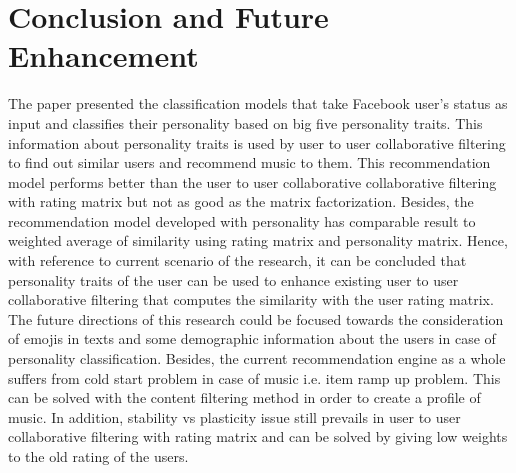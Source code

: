 \documentclass[journal]{IEEEtran}
\begin{document}
\section{Conclusion and Future Enhancement}
The paper presented the classification models that take Facebook user's status as input and classifies their personality based on big five personality traits. This information about personality traits is used by user to user collaborative filtering to find out similar users and recommend music to them. This recommendation model performs better than the user to user collaborative collaborative filtering with rating matrix but not as good as the matrix factorization. Besides, the recommendation model developed with personality has comparable result to weighted average of similarity using rating matrix and personality matrix. Hence, with reference to current scenario of the research, it can be concluded that personality traits of the user can be used to enhance existing user to user collaborative filtering that computes the similarity with the user rating matrix.
The future directions of this research could be focused towards the consideration of emojis in texts and some demographic information about the users in case of personality classification. Besides, the current recommendation engine as a whole suffers from cold start problem in case of music i.e. item ramp up problem. This can be solved with the content filtering method in order to create a profile of music. In addition, stability vs plasticity issue still prevails in user to user collaborative filtering with rating matrix and can be solved by giving low weights to the old rating of the users.

 



%
%
\end{document}
